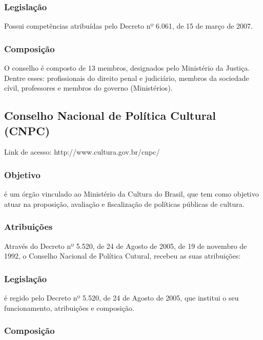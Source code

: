 \subsubsection*{Legislação}


Possui competências atribuídas pelo Decreto nº
6.061, de 15 de março de 2007.


\subsubsection*{Composição}


O conselho é composto de 13 membros, designados pelo Ministério da
Justiça. Dentre esses: profissionais do direito penal e
judiciário, membros da sociedade cívil, professores e membros do
governo (Ministérios).

\newpage
\subsection*{Conselho Nacional de Política Cultural (CNPC)}

Link de acesso: http://www.cultura.gov.br/cnpc/


\subsubsection*{Objetivo}


é um órgão vinculado ao Ministério da Cultura do Brasil, que tem
como objetivo atuar na proposição, avaliação e
fiscalização de políticas públicas de cultura.

\subsubsection*{Atribuições}

Através do Decreto nº 5.520, de 24 de Agosto de
2005, de 19 de novembro de 1992, o Conselho Nacional de Política
Cutural, recebeu as suas atribuições:


\subsubsection*{Legislação}


é regido pelo Decreto nº 5.520, de 24 de Agosto de
2005, que institui o seu funcionamento, atribuições e
composição.


\subsubsection*{Composição}

